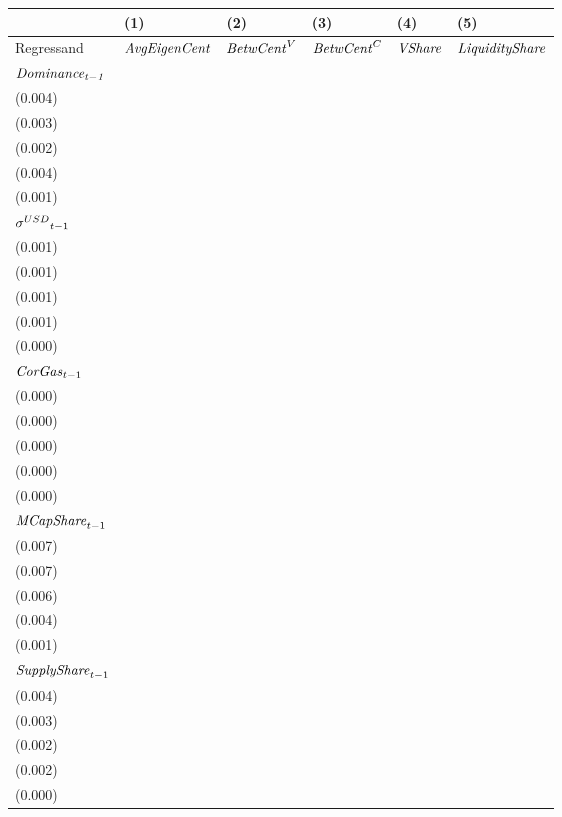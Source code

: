 \begin{tabular}{llllll}
\toprule
{} &                                   (1) &                                   (2) &                                  (3) &                                  (4) &                                   (5) \\
\midrule
Regressand                   &                  ${\it AvgEigenCent}$ &                    ${\it BetwCent}^V$ &                   ${\it BetwCent}^C$ &                       ${\it VShare}$ &                ${\it LiquidityShare}$ \\
$\it Dominance_{t-1}$        &   \makecell{$0.713^{***}$ \\ (0.004)} &   \makecell{$0.824^{***}$ \\ (0.003)} &  \makecell{$0.926^{***}$ \\ (0.002)} &  \makecell{$0.717^{***}$ \\ (0.004)} &   \makecell{$0.972^{***}$ \\ (0.001)} \\
${{\it \sigma}^{USD}}_{t-1}$ &   \makecell{$0.005^{***}$ \\ (0.001)} &      \makecell{$0.001^{}$ \\ (0.001)} &     \makecell{$0.000^{}$ \\ (0.001)} &   \makecell{$0.001^{**}$ \\ (0.001)} &     \makecell{$-0.000^{}$ \\ (0.000)} \\
${{\it CorGas}}_{t-1}$       &    \makecell{$0.001^{**}$ \\ (0.000)} &      \makecell{$0.000^{}$ \\ (0.000)} &     \makecell{$0.000^{}$ \\ (0.000)} &  \makecell{$0.001^{***}$ \\ (0.000)} &     \makecell{$-0.000^{}$ \\ (0.000)} \\
${{\it MCapShare}}_{t-1}$    &  \makecell{$-0.030^{***}$ \\ (0.007)} &   \makecell{$0.172^{***}$ \\ (0.007)} &  \makecell{$0.085^{***}$ \\ (0.006)} &  \makecell{$0.055^{***}$ \\ (0.004)} &   \makecell{$0.020^{***}$ \\ (0.001)} \\
${{\it SupplyShare}}_{t-1}$  &   \makecell{$0.036^{***}$ \\ (0.004)} &  \makecell{$-0.013^{***}$ \\ (0.003)} &   \makecell{$-0.004^{*}$ \\ (0.002)} &  \makecell{$0.017^{***}$ \\ (0.002)} &  \makecell{$-0.004^{***}$ \\ (0.000)} \\

\end{tabular}
